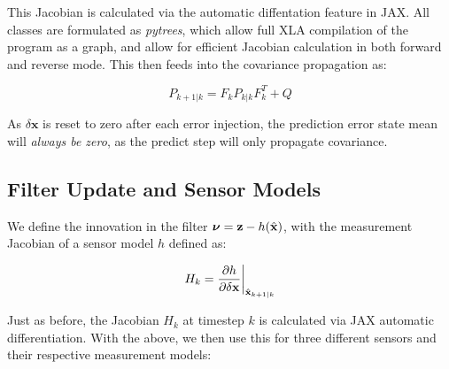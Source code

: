 This Jacobian is calculated via the automatic diffentation feature in JAX. All classes are formulated as \textit{pytrees}, which allow full XLA compilation of the program as a graph, and allow for efficient Jacobian calculation in both forward and reverse mode. This then feeds into the covariance propagation as:

\begin{equation}
  P_{k+1|k} = F_k P_{k|k} F_k^T + Q
\end{equation}

As $\delta \mathbf{x}$ is reset to zero after each error injection, the prediction error state mean will \textit{always be zero}, as the predict step will only propagate covariance.

\subsection{Filter Update and Sensor Models}

We define the innovation in the filter $\boldsymbol{\nu} = \mathbf{z} - h(\hat{\mathbf{x}})$, with the measurement Jacobian of a sensor model $h$ defined as:

\begin{equation}
  H_k = \frac{\partial h}{\partial \delta \mathbf{x}} \biggr|_{\hat{\mathbf{x}}_{k+1|k}}
\end{equation}

Just as before, the Jacobian $H_k$ at timestep $k$ is calculated via JAX automatic differentiation. With the above, we then use this for three different sensors and their respective measurement models:


